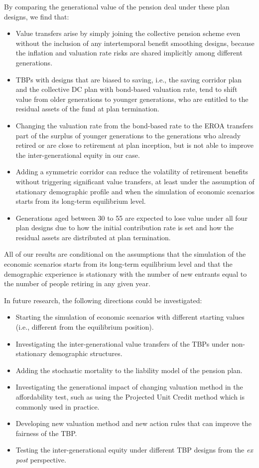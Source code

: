 \documentclass{sfuthesis}
\numberwithin{equation}{chapter}
\begin{document}
	
		\justify
		By comparing the generational value of the pension deal under these plan designs, we find that:
		\begin{itemize}
			\item Value transfers arise by simply joining the collective pension scheme even without the inclusion of any intertemporal benefit smoothing designs, because the inflation and valuation rate risks are  shared implicitly among different generations.
			\item TBPs with designs that are biased to saving, i.e., the saving corridor plan and the collective DC plan with bond-based valuation rate, tend to shift value from older generations to younger generations, who  are entitled to the residual assets of the fund at plan termination.
			\item Changing the valuation rate from the bond-based rate to the EROA transfers part of the surplus of younger generations to the generations who already retired or are close to retirement at plan inception, but is not able to improve the inter-generational equity in our case.
			\item Adding a symmetric corridor can reduce the volatility of retirement benefits without triggering significant value transfers, at least under the assumption of stationary demographic profile and when the simulation of economic scenarios starts from its long-term equilibrium level.
			\item Generations aged between 30 to 55 are expected to lose value under all four plan designs due to how the initial contribution rate is set and how the residual assets are distributed at plan termination.
		\end{itemize}
	
	
		\justify
		All of our results are conditional on the assumptions that the simulation of the economic scenarios starts from its long-term equilibrium level and that the demographic experience is stationary with the number of new entrants equal to the number of people retiring in any given year. 
	
	
		\justify
	   In future research, the following directions could be investigated:
	   \begin{itemize}
	   	\item Starting the simulation of economic scenarios with different starting values (i.e., different from the equilibrium position).
	   	\item Investigating the inter-generational value transfers of the TBPs under non-stationary demographic structures.
	   	\item Adding the stochastic mortality to the liability model of the pension plan.
	   	\item Investigating the generational impact of changing valuation method in the affordability test, such as using the Projected Unit Credit method which is commonly used in practice.
	   	\item Developing new valuation method and new action rules that can improve the fairness of the TBP.
	   	\item Testing the inter-generational equity under different TBP designs from the \textit{ex post} perspective.	   	
	   \end{itemize}
\end{document}
